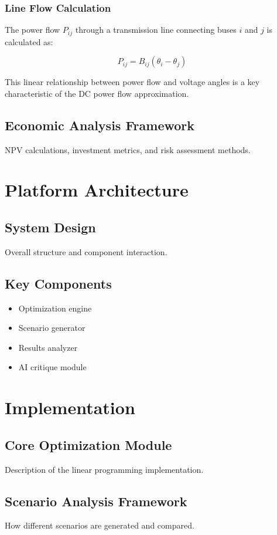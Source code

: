 \documentclass{article}
\begin{document}
\subsubsection{Line Flow Calculation}
The power flow $P_{ij}$ through a transmission line connecting buses $i$ and $j$ is calculated as:

\begin{equation}
    P_{ij} = B_{ij}(\theta_i - \theta_j)
\end{equation}

This linear relationship between power flow and voltage angles is a key characteristic of the DC power flow approximation.

\subsection{Economic Analysis Framework}
NPV calculations, investment metrics, and risk assessment methods.

\section{Platform Architecture}
\subsection{System Design}
Overall structure and component interaction.

\subsection{Key Components}
\begin{itemize}
    \item Optimization engine
    \item Scenario generator
    \item Results analyzer
    \item AI critique module
\end{itemize}

\section{Implementation}
\subsection{Core Optimization Module}
Description of the linear programming implementation.

\subsection{Scenario Analysis Framework}
How different scenarios are generated and compared.
\end{document}
